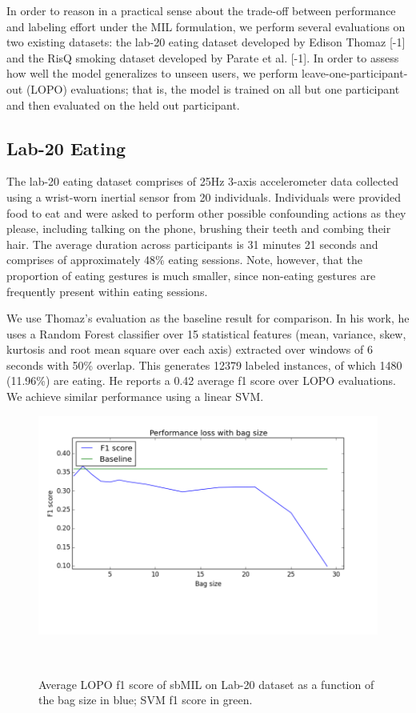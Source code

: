 \documentclass{sigchi}
\begin{document}
In order to reason in a practical sense about the trade-off between performance and labeling effort under the MIL formulation, we perform several evaluations on two existing datasets: the lab-20 eating dataset developed by Edison Thomaz [-1] and the RisQ smoking dataset developed by Parate et al. [-1]. In order to assess how well the model generalizes to unseen users, we perform leave-one-participant-out (LOPO) evaluations; that is, the model is trained on all but one participant and then evaluated on the held out participant.

\subsection{Lab-20 Eating}

The lab-20 eating dataset comprises of 25Hz 3-axis accelerometer data collected using a wrist-worn inertial sensor from 20 individuals. Individuals were provided food to eat and were asked to perform other possible confounding actions as they please, including talking on the phone, brushing their teeth and combing their hair. The average duration across participants is 31 minutes 21 seconds and comprises of approximately 48\% eating sessions. Note, however, that the proportion of eating gestures is much smaller, since non-eating gestures are frequently present within eating sessions.

We use Thomaz's evaluation as the baseline result for comparison. In his work, he uses a Random Forest classifier over 15 statistical features (mean, variance, skew, kurtosis and root mean square over each axis) extracted over windows of 6 seconds with 50\% overlap. This generates 12379 labeled instances, of which 1480 (11.96\%) are eating. He reports a 0.42 average f1 score over LOPO evaluations. We achieve similar performance using a linear SVM.

\begin{figure}
\centering
  \includegraphics[width=0.9\columnwidth]{figures/sbMIL_bag_size2}
  \caption{Average LOPO f1 score of sbMIL on Lab-20 dataset as a function of the bag size in blue; SVM f1 score in green.}~\label{fig:figure1}
\end{figure}
\end{document}
